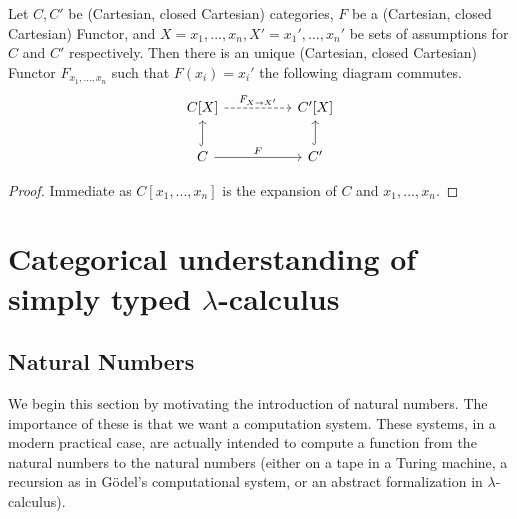 \begin{proposition}\label{unique-polynomial-functor}Let $C,C'$ be (Cartesian, closed Cartesian) categories, $F$ be a (Cartesian, closed Cartesian) Functor, and $X={x_1,...,x_n}, X'={x_1',...,x_n'}$ be sets of assumptions for $C$ and $C'$ respectively. Then there is an unique (Cartesian, closed Cartesian) Functor $F_{x_1,...,x_n}$ such that $F(x_i)=x_i'$ the following diagram commutes. 
  \[
    \begin{tikzcd}
      C[X]\arrow[dashed]{rr}{F_{X\to X'}}&& C'[X]\\
      C \arrow{rr}{F}\arrow[hookrightarrow]{u}{}&& C'\arrow[hookrightarrow]{u}{}
    \end{tikzcd}
  \]
\end{proposition}
\begin{proof}
Immediate as $C[x_1,...,x_n]$ is the expansion of $C$ and ${x_1,...,x_n}$.  
\end{proof}
\section{Categorical understanding of simply typed $\lambda$-calculus}
\subsection{Natural Numbers}


We begin this section by motivating the introduction of natural numbers. The importance of these is that we want a computation system. These systems, in a modern practical case, are actually intended to compute a function from the natural numbers to the natural numbers (either on a tape in a Turing machine, a recursion as in Gödel's computational system, or an abstract formalization in $\lambda$-calculus).\\

